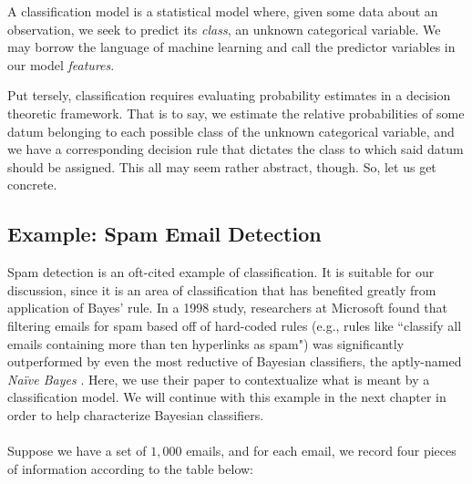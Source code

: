 \documentclass[12pt,twoside]{reedthesis}
\begin{document}
A classification model is a statistical model where, given some data about an observation, we seek to predict its {\em class}, an unknown categorical variable. We may borrow the language of machine learning and call the predictor variables in our model {\em features}.

Put tersely, classification requires evaluating probability estimates in a decision theoretic framework. That is to say, we estimate the relative probabilities of some datum belonging to each possible class of the unknown categorical variable, and we have a corresponding decision rule that dictates the class to which said datum should be assigned. This all may seem rather abstract, though. So, let us get concrete.

	\subsection*{Example: Spam Email Detection}
	Spam detection is an oft-cited example of classification. It is suitable for our discussion, since it is an area of classification that has benefited greatly from application of Bayes' rule. In a 1998 study, researchers at Microsoft found that filtering emails for spam based off of hard-coded rules (e.g., rules like ``classify all emails containing more than ten hyperlinks as spam") was significantly outperformed by even the most reductive of Bayesian classifiers, the aptly-named {\em Na\"{i}ve Bayes} \cite{msft}. Here, we use their paper to contextualize what is meant by a classification model. We will continue with this example in the next chapter in order to help characterize Bayesian classifiers. \\ \\
	
	Suppose we have a set of $1,000$ emails, and for each email, we record four pieces of information according to the table below:
	
\end{document}
